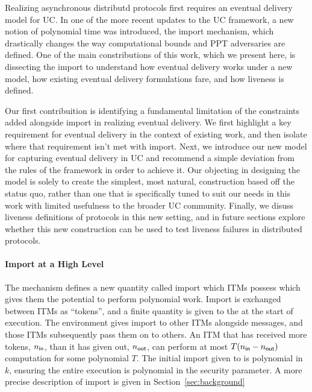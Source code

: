 Realizing asynchronous distributd protocols first requires an eventual delivery
model for UC.  In one of the more recent updates to the UC framework, a new
notion of polynomial time was introduced, the import mechanism, which
drastically changes the way computational bounds and PPT adversaries are
defined.  One of the main constributions of this work, which we present here,
is dissecting the import to understand how eventual delivery works under a new
model, how existing eventual delivery formulations fare, and how liveness is
defined.

Our first contribuition is identifying a fundamental limitation of the
constraints added alongside import in realizing eventual delivery.  We first
highlight a key requirement for eventual delivery in the context of existing
work, and then isolate where that requirement isn't met with import.  Next, we
introduce our new model for capturing eventual delivery in UC and recommend a
simple deviation from the rules of the framework in order to achieve it.  Our
objecting in designing the model is solely to create the simplest, most
natural, construction based off the status quo, rather than one that is
specifically tuned to suit our needs in this work with limited usefulness to
the broader UC community.  Finally, we disuss liveness definitions of protocols
in this new setting, and in future sections explore whether this new
construction can be used to test liveness failures in distributed protocols.

\paragraph{Import at a High Level} The mechanism defines a new quantity called
import which ITMs possess which gives them the potential to perform polynomial
work.  Import is exchanged between ITMs as ``tokens'', and a finite quantity is
given to the \Z at the start of execution.  The environment gives import to
other ITMs alongside messages, and those ITMs subsequently pass them on to
others.  An ITM that has received more tokens, $n_{{\mathsf {in}}}$, than it has given
out, $n_{{\mathsf {out}}}$, can perform at most $T(n_{{\mathsf {in}}} - n_{{\mathsf {out}}})$ computation for
some polynomial $T$.  The initial import given to \Z is polynomial in $k$,
ensuring the entire execution is polynomial in the security parameter.  A more
precise description of import is given in Section~\ref{sec:background}


